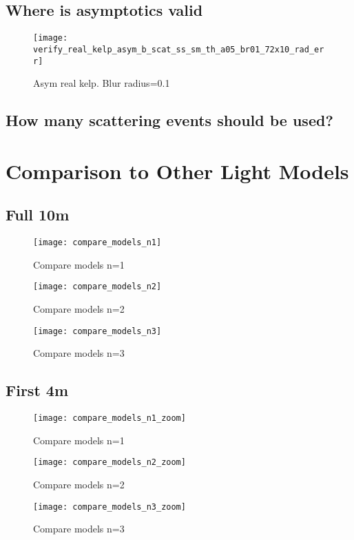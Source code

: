 \subsection{Where is asymptotics valid}

\begin{figure}[H]
  \centering
  \texttt{[image: verify\_real\_kelp\_asym\_b\_scat\_ss\_sm\_th\_a05\_br01\_72x10\_rad\_err]}
  \caption{Asym real kelp. Blur radius=0.1}
  \label{fig:asym_real_kelp_br01}
\end{figure}


\subsection{How many scattering events should be used?}

\section{Comparison to Other Light Models}


\subsection{Full 10m}
\begin{figure}[H]
  \centering
  \texttt{[image: compare\_models\_n1]}
  \caption{Compare models n=1}
  \label{fig:compare_models_n1}
\end{figure}
\begin{figure}[H]
  \centering
  \texttt{[image: compare\_models\_n2]}
  \caption{Compare models n=2}
  \label{fig:compare_models_n2}
\end{figure}
\begin{figure}[H]
  \centering
  \texttt{[image: compare\_models\_n3]}
  \caption{Compare models n=3}
  \label{fig:compare_models_n3}
\end{figure}

\subsection{First 4m}
\begin{figure}[H]
  \centering
  \texttt{[image: compare\_models\_n1\_zoom]}
  \caption{Compare models n=1}
  \label{fig:compare_models_n1}
\end{figure}
\begin{figure}[H]
  \centering
  \texttt{[image: compare\_models\_n2\_zoom]}
  \caption{Compare models n=2}
  \label{fig:compare_models_n2}
\end{figure}
\begin{figure}[H]
  \centering
  \texttt{[image: compare\_models\_n3\_zoom]}
  \caption{Compare models n=3}
  \label{fig:compare_models_n3}
\end{figure}

